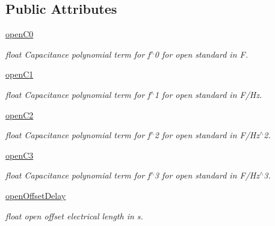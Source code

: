 \subsection*{Public Attributes}
\begin{DoxyCompactItemize}
\item 
\hyperlink{classSignalIntegrity_1_1Measurement_1_1CalKit_1_1CalibrationKit_1_1CalibrationConstants_a0c4527e8685d10ef528a006430b26774}{open\+C0}
\begin{DoxyCompactList}\small\item\em float Capacitance polynomial term for f$^\wedge$0 for open standard in F. \end{DoxyCompactList}\item 
\hyperlink{classSignalIntegrity_1_1Measurement_1_1CalKit_1_1CalibrationKit_1_1CalibrationConstants_a8f7d2381fd71358d01d53cfac734536e}{open\+C1}
\begin{DoxyCompactList}\small\item\em float Capacitance polynomial term for f$^\wedge$1 for open standard in F/\+Hz. \end{DoxyCompactList}\item 
\hyperlink{classSignalIntegrity_1_1Measurement_1_1CalKit_1_1CalibrationKit_1_1CalibrationConstants_abdd0ba494c0d6d4943ce16d6970279d2}{open\+C2}
\begin{DoxyCompactList}\small\item\em float Capacitance polynomial term for f$^\wedge$2 for open standard in F/\+Hz$^\wedge$2. \end{DoxyCompactList}\item 
\hyperlink{classSignalIntegrity_1_1Measurement_1_1CalKit_1_1CalibrationKit_1_1CalibrationConstants_a3ac8a49dfd215b17e8ff64b0615712c0}{open\+C3}
\begin{DoxyCompactList}\small\item\em float Capacitance polynomial term for f$^\wedge$3 for open standard in F/\+Hz$^\wedge$3. \end{DoxyCompactList}\item 
\hyperlink{classSignalIntegrity_1_1Measurement_1_1CalKit_1_1CalibrationKit_1_1CalibrationConstants_a43fb0f63f1a71aa84549bfb12776ac13}{open\+Offset\+Delay}
\begin{DoxyCompactList}\small\item\em float open offset electrical length in s. \end{DoxyCompactList}\item 
\mbox{\label{classSignalIntegrity_1_1Measurement_1_1CalKit_1_1CalibrationKit_1_1CalibrationConstants_a4c6fb99b586790a8f5a5b1091dff2f3b}} 

\end{DoxyCompactItemize}
